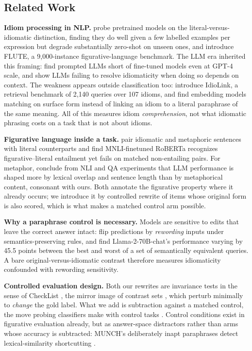 \documentclass{article}   %
\newcommand{\citetf}[1]{\citet{#1}}
\newcommand{\citepf}[1]{\citep{#1}}
\begin{document}
\subsection{Related Work}

\textbf{Idiom processing in NLP.} \citetf{tayyar2021astitch} probe pretrained
models on the literal-versus-idiomatic distinction, finding they do well given
a few labelled examples per expression but degrade substantially zero-shot on
unseen ones, and \citetf{chakrabarty2022flute} introduce FLUTE, a
9{,}000-instance figurative-language benchmark. The LLM era inherited this
framing: \citetf{phelps2024sign} find prompted LLMs short of fine-tuned models
even at GPT-4 scale, and \citetf{mi2025dice} show LLMs failing to resolve
idiomaticity when doing so depends on context. The weakness appears outside
classification too: \citetf{hashiloni2026idiolink} introduce IdioLink, a
retrieval benchmark of 2{,}140 queries over 107 idioms, and find embedding
models matching on surface form instead of linking an idiom to a literal
paraphrase of the same meaning. All of this measures idiom
\emph{comprehension}, not what idiomatic phrasing costs on a task that is not
about idioms.

\textbf{Figurative language inside a task.} \citetf{stowe2022impli} pair
idiomatic and metaphoric sentences with literal counterparts and find
MNLI-finetuned RoBERTa recognizes figurative--literal entailment yet fails on
matched non-entailing pairs. For metaphor, \citetf{sanchezbayona2025metaphor}
conclude from NLI and QA experiments that LLM performance is shaped more by
lexical overlap and sentence length than by metaphorical content, consonant
with ours. Both annotate the figurative property where it already occurs; we
introduce it by controlled rewrite of items whose original form is also scored,
which is what makes a matched control arm possible.

\textbf{Why a paraphrase control is necessary.} Models are sensitive to edits
that leave the correct answer intact: \citetf{ribeiro2018semantically} flip
predictions by \emph{rewording} inputs under semantics-preserving rules, and
\citetf{cao2024worst} find Llama-2-70B-chat's performance varying by 45.5
points between the best and worst of a set of semantically equivalent queries.
A bare original-versus-idiomatic contrast therefore measures idiomaticity
confounded with rewording sensitivity.

\textbf{Controlled evaluation design.} Both our rewrites are invariance tests
in the sense of CheckList \citepf{ribeiro2020checklist}, the mirror image of
contrast sets \citepf{gardner2020contrast}, which perturb minimally to
\emph{change} the gold label. What we add is subtraction against a matched
control, the move probing classifiers make with control tasks
\citepf{hewitt2019control}. Control conditions exist in figurative evaluation
already, but as answer-space distractors rather than arms whose accuracy is
subtracted: MUNCH's deliberately inapt paraphrases detect lexical-similarity
shortcutting \citepf{tong2024munch}.
\end{document}
